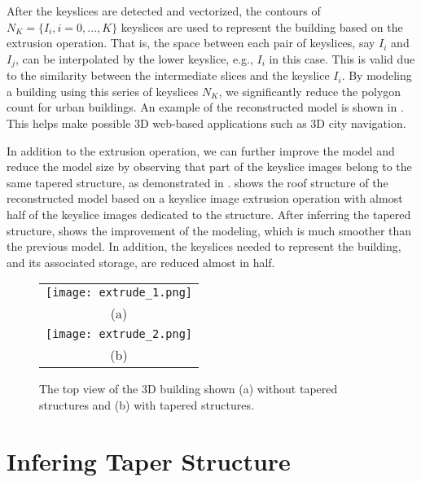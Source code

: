 
After the keyslices are detected and vectorized, the contours of
$N_K = \{I_{i}, i = 0, ..., K \}$ keyslices are used to represent
the building based on the extrusion operation.
That is, the space between each pair of keyslices, say $I_{i}$ and $I_{j}$,
can be interpolated by the lower keyslice, e.g., $I_{i}$ in this case.
This is valid due to the similarity between the intermediate slices
and the keyslice $I_{i}$.
By modeling a building using this series of keyslices $N_K$, we
significantly reduce the polygon count for urban buildings. 
An example of the reconstructed model is shown in .
This helps make possible 3D web-based applications such as 3D city navigation.

In addition to the extrusion operation, we can further improve the model
and reduce the model size by observing that part of the keyslice images
belong to the same tapered structure, as demonstrated in .
 shows the roof structure
of the reconstructed model based on a keyslice image extrusion operation with
almost half of the keyslice images dedicated to the structure.
After inferring the tapered structure,  shows the improvement
of the modeling, which is much smoother than the previous model.
In addition, the keyslices needed to represent the building, and its
associated storage, are reduced almost in half.

\begin{figure}[htbp]
\begin{center}
\begin{tabular}{c}
\texttt{[image: extrude\_1.png]} \\
(a) \\
\texttt{[image: extrude\_2.png]} \\
(b)
\end{tabular}
\end{center}
\caption{The top view of the 3D building shown (a) without tapered structures
and (b) with tapered structures.}
\label{fig:DXF_top}
\end{figure}

\section{Infering Taper Structure}
\label{sec:tsd}

